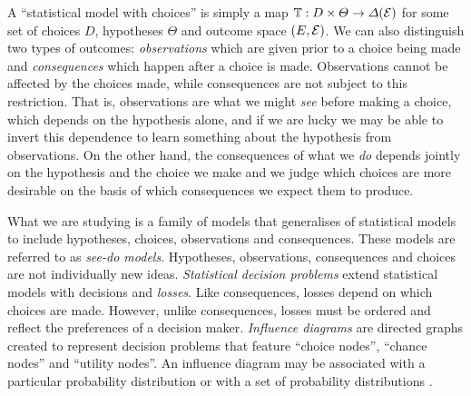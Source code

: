 A ``statistical model with choices'' is simply a map $\mathbb{T}:D\times \Theta\to \Delta(\mathcal{E})$ for some set of choices $D$, hypotheses $\Theta$ and outcome space $(E,\mathcal{E})$. We can also distinguish two types of outcomes: \emph{observations} which are given prior to a choice being made and \emph{consequences} which happen after a choice is made. Observations cannot be affected by the choices made, while consequences are not subject to this restriction. That is, observations are what we might \emph{see} before making a choice, which depends on the hypothesis alone, and if we are lucky we may be able to invert this dependence to learn something about the hypothesis from observations. On the other hand, the consequences of what we \emph{do} depends jointly on the hypothesis and the choice we make and we judge which choices are more desirable on the basis of which consequences we expect them to produce. 

What we are studying is a family of models that generalises of statistical models to include hypotheses, choices, observations and consequences. These models are referred to as \emph{see-do models}. Hypotheses, observations, consequences and choices are not individually new ideas. \emph{Statistical decision problems} \citep{wald_statistical_1950,savage_foundations_1972} extend statistical models with decisions and \emph{losses}. Like consequences, losses depend on which choices are made. However, unlike consequences, losses must be ordered and reflect the preferences of a decision maker. \emph{Influence diagrams} are directed graphs created to represent decision problems that feature ``choice nodes'', ``chance nodes'' and ``utility nodes''. An influence diagram may be associated with a particular probability distribution \cite{nilsson_evaluating_2013} or with a set of probability distributions \cite{dawid_influence_2002}.

